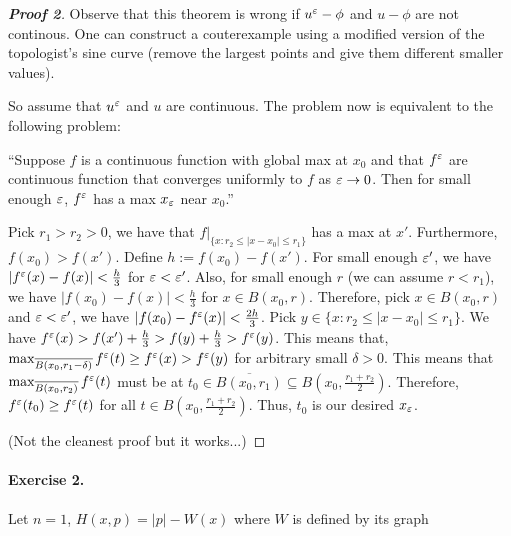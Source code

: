 \documentclass[12pt, oneside]{amsart}  	%
\begin{document}
\begin{proof}[\textbf{Proof 2}]
	Observe that this theorem is wrong if $u^\varepsilon -\phi$  and $u-\phi$ are not continous. One can construct a couterexample using a modified version of the topologist's sine curve (remove the largest points and give them different smaller values).
	
	So assume that $u^\varepsilon$ and $u$ are continuous. The problem now is equivalent to the following problem:
	
	``Suppose $f$ is a continuous function with global max at $x_0$ and that $f^\varepsilon$ are continuous function that converges uniformly to $f$ as $\varepsilon\to 0$. Then for small enough $\varepsilon$, $f^\varepsilon$ has a max $x_\varepsilon$ near $x_0$.''
	
	Pick $r_1>r_2>0$, we have that $f|_{\{x:r_2\le|x-x_0|\le r_1\}}$ has a max at $x'$. Furthermore, $f(x_0)>f(x')$. Define $h:=f(x_0)-f(x')$. For small enough $\varepsilon'$, we have $|f^\varepsilon(x)-f(x)|<\frac{h}{3}$ for $\varepsilon<\varepsilon'$. Also, for small enough $r$ (we can assume $r<r_1$), we have $|f(x_0)-f(x)|<\frac{h}{3}$ for $x\in B(x_0,r)$. Therefore, pick $x\in B(x_0,r)$ and $\varepsilon<\varepsilon'$, we have $|f(x_0)-f^\varepsilon(x)|<\frac{2h}{3}$. Pick $y\in\{x:r_2\le|x-x_0|\le r_1\}$. We have $f^\varepsilon(x)>f(x')+\frac{h}{3}>f(y)+\frac{h}{3}>f^\varepsilon(y)$. This means that, $\max_{\overline{B(x_0,r_1-\delta)}} f^\varepsilon(t) \ge f^\varepsilon(x)>f^\varepsilon(y)$ for arbitrary small $\delta>0$. This means that $\max_{\overline{B(x_0,r_2)}} f^\varepsilon(t)$ must be at $t_0\in\overline{B(x_0,r_1)}\subseteq B(x_0, \frac{r_1+r_2}{2})$. Therefore, $f^\varepsilon(t_0) \ge f^\varepsilon(t)$ for all $t\in B(x_0, \frac{r_1+r_2}{2})$. Thus, $t_0$ is our desired $x_\varepsilon$.

(Not the cleanest proof but it works...)
\end{proof}

\vspace*{0.2cm}



\paragraph{\textbf{Exercise 2.}} Let $n = 1$, $H(x,p) = |p| - W(x)$ where $W$ is defined by its graph
\end{document}

